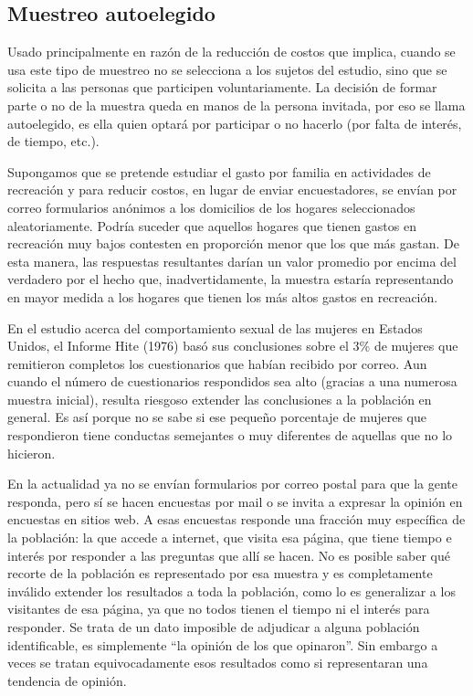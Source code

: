 \documentclass[]{book}
\begin{document}
\hypertarget{muestreo-autoelegido}{%
\subsection{Muestreo autoelegido}\label{muestreo-autoelegido}}

Usado principalmente en razón de la reducción de costos que implica,
cuando se usa este tipo de muestreo no se selecciona a los sujetos del
estudio, sino que se solicita a las personas que participen
voluntariamente. La decisión de formar parte o no de la muestra queda en
manos de la persona invitada, por eso se llama autoelegido, es ella
quien optará por participar o no hacerlo (por falta de interés, de
tiempo, etc.).

Supongamos que se pretende estudiar el gasto por familia en actividades
de recreación y para reducir costos, en lugar de enviar encuestadores,
se envían por correo formularios anónimos a los domicilios de los
hogares seleccionados aleatoriamente. Podría suceder que aquellos
hogares que tienen gastos en recreación muy bajos contesten en
proporción menor que los que más gastan. De esta manera, las respuestas
resultantes darían un valor promedio por encima del verdadero por el
hecho que, inadvertidamente, la muestra estaría representando en mayor
medida a los hogares que tienen los más altos gastos en recreación.

En el estudio acerca del comportamiento sexual de las mujeres en Estados
Unidos, el Informe Hite (1976) basó sus conclusiones sobre el 3\% de
mujeres que remitieron completos los cuestionarios que habían recibido
por correo. Aun cuando el número de cuestionarios respondidos sea alto
(gracias a una numerosa muestra inicial), resulta riesgoso extender las
conclusiones a la población en general. Es así porque no se sabe si ese
pequeño porcentaje de mujeres que respondieron tiene conductas
semejantes o muy diferentes de aquellas que no lo hicieron.

En la actualidad ya no se envían formularios por correo postal para que
la gente responda, pero sí se hacen encuestas por mail o se invita a
expresar la opinión en encuestas en sitios web. A esas encuestas
responde una fracción muy específica de la población: la que accede a
internet, que visita esa página, que tiene tiempo e interés por
responder a las preguntas que allí se hacen. No es posible saber qué
recorte de la población es representado por esa muestra y es
completamente inválido extender los resultados a toda la población, como
lo es generalizar a los visitantes de esa página, ya que no todos tienen
el tiempo ni el interés para responder. Se trata de un dato imposible de
adjudicar a alguna población identificable, es simplemente ``la opinión
de los que opinaron''. Sin embargo a veces se tratan equivocadamente esos
resultados como si representaran una tendencia de opinión.
\end{document}
